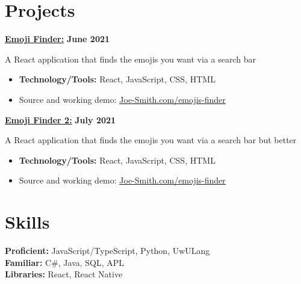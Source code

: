 \documentclass[letterpaper, 11pt]{article}
\newcommand{\bulletSpace}{\vspace{-8pt}}
\newcommand{\secStartSpace}{\vspace{3pt}}
\newcommand{\secEndSpace}{\vspace{5pt}}
\newcommand{\spaceCollapse}{\vspace{-5pt}}
\begin{document}
\section{\color{blue} \textbf{Projects}}
\secStartSpace

\begin{addmargin}[1em]{1em}
		
	\noindent\href{https://github.com/Joe-Smith}{\textbf{Emoji Finder:}}  \hfill \textbf{June 2021} 
		
	\noindent A React application that finds the emojis you want via a search bar
	\spaceCollapse
	\begin{itemize}
		\item \textbf{Technology/Tools:} React, JavaScript, CSS, HTML
		      \bulletSpace
		\item Source and working demo:  \href{https://github.com/Joe-Smith}{\underline{Joe-Smith.com/emojis-finder}}
	\end{itemize}
	
	\noindent\href{https://github.com/Joe-Smith}{\textbf{Emoji Finder 2:}}  \hfill \textbf{July 2021} 
		
	\noindent A React application that finds the emojis you want via a search bar but better
	\spaceCollapse
	\begin{itemize}
		\item \textbf{Technology/Tools:} React, JavaScript, CSS, HTML
		      \bulletSpace
		\item Source and working demo:  \href{https://github.com/Joe-Smith}{\underline{Joe-Smith.com/emojis-finder}}
	\end{itemize}
		
		
\end{addmargin}
\secEndSpace


\section{\color{blue} \textbf{Skills}}
\secStartSpace

\begin{addmargin}[1em]{1em}
	\noindent \textbf{Proficient:} JavaScript/TypeScript, Python, UwULang \\
	\noindent \textbf{Familiar:} C\#, Java, SQL, APL \\
	\noindent \textbf{Libraries:} React, React Native
\end{addmargin}
\secEndSpace
\end{document}
